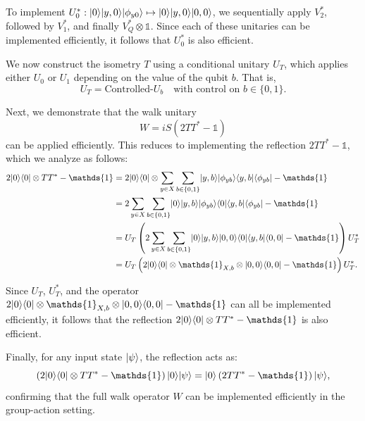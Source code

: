 \documentclass[12pt]{report}
\begin{document}
To implement \( U_0^* : \lvert0\rangle \lvert y, 0\rangle \lvert\phi_{y0}\rangle \mapsto \lvert0\rangle \lvert y, 0\rangle \lvert0, 0\rangle \), we sequentially apply \( V_2^* \), followed by \( V_1^* \), and finally \( V_Q^* \otimes \mathds{1} \). Since each of these unitaries can be implemented efficiently, it follows that \( U_0^* \) is also efficient.

We now construct the isometry \( T \) using a conditional unitary \( U_T \), which applies either \( U_0 \) or \( U_1 \) depending on the value of the qubit \( b \). That is,
\[
U_T = \text{Controlled-}U_b \quad \text{with control on } b \in \{0,1\}.
\]

Next, we demonstrate that the walk unitary
\[
W = iS(2TT^* - \mathds{1})
\]
can be applied efficiently. This reduces to implementing the reflection \( 2TT^* - \mathds{1} \), which we analyze as follows:
\begin{align*}
2\ket{0}\bra{0} \otimes TT^* - \mathds{1}
&= 2\ket{0}\bra{0} \otimes \sum_{y \in X} \sum_{b \in \{0,1\}} \ket{y,b} \ket{\phi_{yb}} \bra{y,b} \bra{\phi_{yb}} - \mathds{1} \\
&= 2\sum_{y \in X} \sum_{b \in \{0,1\}} \ket{0} \ket{y,b} \ket{\phi_{yb}} \bra{0} \bra{y,b} \bra{\phi_{yb}} - \mathds{1} \\
&= U_T \left( 2 \sum_{y \in X} \sum_{b \in \{0,1\}} \ket{0} \ket{y,b} \ket{0,0} \bra{0} \bra{y,b} \bra{0,0} - \mathds{1} \right) U_T^* \\
&= U_T \left( 2\ket{0}\bra{0} \otimes \mathds{1}_{X,b} \otimes \ket{0,0}\bra{0,0} - \mathds{1} \right) U_T^*.
\end{align*}

Since \( U_T \), \( U_T^* \), and the operator \( 2\ket{0}\bra{0} \otimes \mathds{1}_{X,b} \otimes \ket{0,0}\bra{0,0} - \mathds{1} \) can all be implemented efficiently, it follows that the reflection \( 2\ket{0}\bra{0} \otimes TT^* - \mathds{1} \) is also efficient.

Finally, for any input state \( \lvert\psi\rangle \), the reflection acts as:
\[
\left(2\ket{0}\bra{0} \otimes TT^* - \mathds{1} \right) \ket{0} \ket{\psi} = \ket{0} \left(2TT^* - \mathds{1} \right) \ket{\psi},
\]
confirming that the full walk operator \( W \) can be implemented efficiently in the group-action setting.





\end{document}
